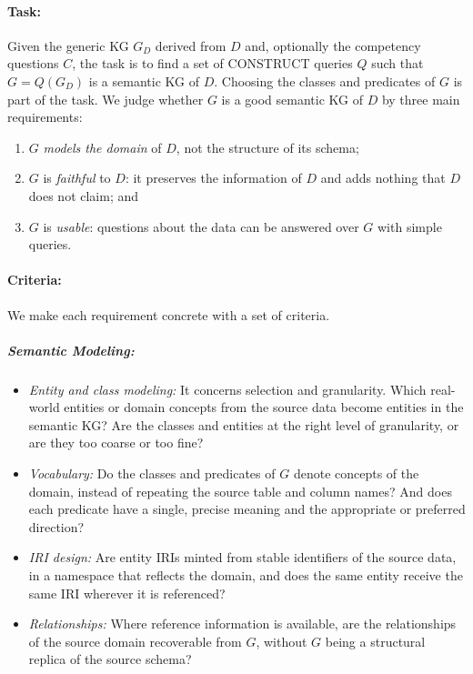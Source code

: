 \paragraph{Task:} Given the generic KG \(G_D\) derived from \(D\) and, optionally the competency questions \(C\), the task is to find a set of CONSTRUCT queries \(Q\) such that \(G = Q(G_D)\) is a semantic KG of \(D\). Choosing the classes and predicates of \(G\) is part of the task. We judge whether \(G\) is a good semantic KG of \(D\) by three main requirements:
\begin{enumerate}
  \item \(G\) \emph{models the domain} of \(D\), not the structure of its schema;
  \item \(G\) is \emph{faithful} to \(D\): it preserves the information of \(D\) and adds nothing that \(D\) does not claim; and
  \item \(G\) is \emph{usable}: questions about the data can be answered over \(G\) with simple queries.
\end{enumerate}

\clearpage
\paragraph{Criteria:} We make each requirement concrete with a set of criteria.
\subparagraph{Semantic Modeling:}
\begin{itemize}[leftmargin=*, itemsep=2pt]
  \item \textit{Entity and class modeling:} It concerns selection and granularity. Which real-world entities or domain concepts from the source data become entities in the semantic KG\@? Are the classes and entities at the right level of granularity, or are they too coarse or too fine?
  \item \textit{Vocabulary:} Do the classes and predicates of \(G\) denote concepts of the domain, instead of repeating the source table and column names? And does each predicate have a single, precise meaning and the appropriate or preferred direction?
  \item \textit{IRI design:} Are entity IRIs minted from stable identifiers of the source data, in a namespace that reflects the domain, and does the same entity receive the same IRI wherever it is referenced?
  \item \textit{Relationships:} Where reference information is available, are the relationships of the source domain recoverable from \(G\), without \(G\) being a structural replica of the source schema?
\end{itemize}

